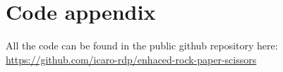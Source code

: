 \documentclass[11pt,a4paper]{report}
\begin{document}
\section*{Code appendix}
All the code can be found in the public github repository here: \url{https://github.com/icaro-rdp/enhaced-rock-paper-scissors }


\printbibliography
{}
\end{document}
